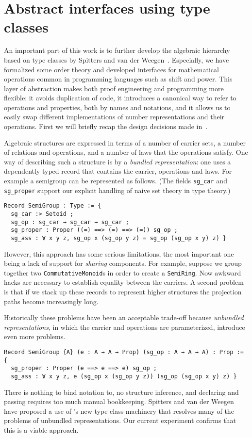 \documentclass[a4paper,10pt,runningheads]{llncs}
\begin{document}
\section{Abstract interfaces using type classes}
\label{section:interfaces}
An important part of this work is to further develop the algebraic hierarchy based on type classes by Spitters and van der Weegen~\cite{math-classes}. Especially, we have formalized some order theory and developed interfaces for mathematical operations common in programming languages such as shift and power. This layer of abstraction makes both proof engineering and programming more flexible: it avoids duplication of code, it introduces a canonical way to refer to operations and properties, both by names and notations, and it allows us to easily swap different implementations of number representations and their operations. First we will briefly recap the design decisions made in~\cite{math-classes}.

Algebraic structures are expressed in terms of a number of carrier sets, a number of relations and operations, and a number of laws that the operations satisfy. One way of describing such a structure is by a \emph{bundled representation}: one uses a dependently typed record that contains the carrier, operations and laws. For example a semigroup can be represented as follows. (The fields \lstinline|sg_car| and \lstinline|sg_proper| support our explicit handling of naive set theory in type theory.)
\label{lstlisting:semigroup_bundled}
\begin{lstlisting}
Record SemiGroup : Type := { 
  sg_car :> Setoid ;
  sg_op : sg_car → sg_car → sg_car ;
  sg_proper : Proper ((=) ==> (=) ==> (=)) sg_op ;
  sg_ass : ∀ x y z, sg_op x (sg_op y z) = sg_op (sg_op x y) z) }
\end{lstlisting}  
However, this approach has some serious limitations, the most important one being a lack of support for \emph{sharing} components. For example, suppose we group together two \lstinline|CommutativeMonoid|s in order to create a \lstinline|SemiRing|. Now awkward hacks are necessary to establish equality between the carriers. A second problem is that if we stack up these records to represent higher structures the projection paths become increasingly long.

Historically these problems have been an acceptable trade-off because \emph{unbundled representations}, in which the carrier and operations are parameterized, introduce even more problems. 
\begin{lstlisting}
Record SemiGroup {A} (e : A → A → Prop) (sg_op : A → A → A) : Prop := { 
  sg_proper : Proper (e ==> e ==> e) sg_op ;
  sg_ass : ∀ x y z, e (sg_op x (sg_op y z)) (sg_op (sg_op x y) z) }
\end{lstlisting}
There is nothing to bind notation to, no structure inference, and declaring and passing requires too much manual bookkeeping. Spitters and van der Weegen have proposed a use of \Coq's new type class machinery that resolves many of the problems of unbundled representations. Our current experiment confirms that this is a viable approach. 
\end{document}
